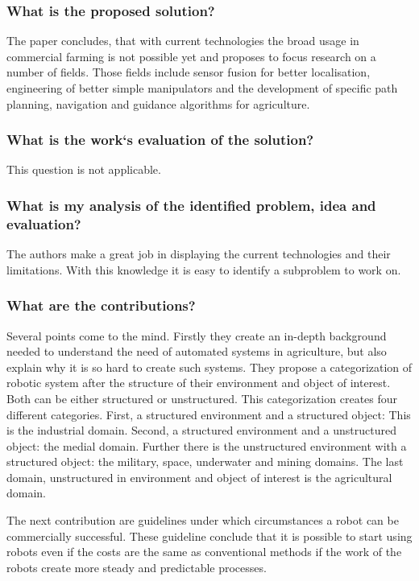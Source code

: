     \subsubsection*{What is the proposed solution?} 
    The paper concludes, that with current technologies the broad usage in commercial farming is not possible yet and 
    proposes to focus research on a number of fields. Those fields include sensor fusion for better localisation, 
    engineering of better simple manipulators and the development of specific path planning, navigation and guidance algorithms
    for agriculture.
    \subsubsection*{What is the work`s evaluation of the solution?}
    This question is not applicable.
    \subsubsection*{What is my analysis of the identified problem, idea and evaluation?}
    The authors make a great job in displaying the current technologies and their limitations. With this knowledge it is 
    easy to identify a subproblem to work on.
    \subsubsection*{What are the contributions?}
    Several points come to the mind. Firstly they create an in-depth background needed to understand the need of automated
    systems in agriculture, but also explain why it is so hard to create such systems. 
    They propose a categorization of robotic system after the structure of their environment and object of interest. Both 
    can be either structured or unstructured. This categorization creates four different categories. First, a structured 
    environment and a structured object: This is the industrial domain. Second, a structured environment and a unstructured
    object: the medial domain. Further there is the unstructured environment with a structured object: the military, space, underwater
    and mining domains. The last domain, unstructured in environment and object of interest is the agricultural domain.
    
    The next contribution are guidelines under which circumstances a robot can be commercially successful. These guideline conclude
    that it is possible to start using robots even if the costs are the same as conventional methods if the work of
    the robots create more steady and predictable processes.
    

